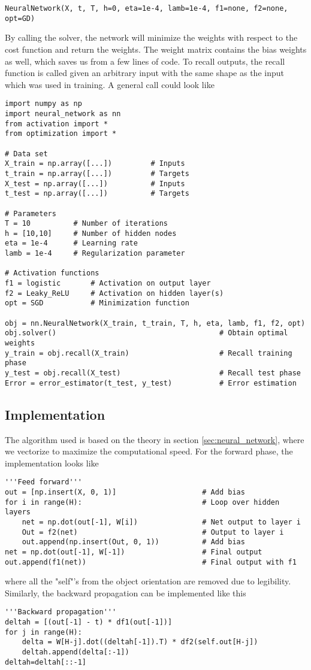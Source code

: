 \lstset{basicstyle=\scriptsize}
\begin{lstlisting}
NeuralNetwork(X, t, T, h=0, eta=1e-4, lamb=1e-4, f1=none, f2=none, opt=GD)
\end{lstlisting}
By calling the solver, the network will minimize the weights with respect to the cost function and return the weights. The weight matrix contains the bias weights as well, which saves us from a few lines of code. To recall outputs, the recall function is called given an arbitrary input with the same shape as the input which was used in training. A general call could look like

\lstset{basicstyle=\scriptsize}
\begin{lstlisting}
import numpy as np
import neural_network as nn
from activation import *
from optimization import *

# Data set
X_train = np.array([...])         # Inputs
t_train = np.array([...])         # Targets
X_test = np.array([...])          # Inputs
t_test = np.array([...])          # Targets

# Parameters
T = 10          # Number of iterations
h = [10,10]     # Number of hidden nodes
eta = 1e-4      # Learning rate
lamb = 1e-4     # Regularization parameter

# Activation functions
f1 = logistic       # Activation on output layer
f2 = Leaky_ReLU	    # Activation on hidden layer(s)
opt = SGD           # Minimization function

obj = nn.NeuralNetwork(X_train, t_train, T, h, eta, lamb, f1, f2, opt)
obj.solver()                                      # Obtain optimal weights
y_train = obj.recall(X_train)                     # Recall training phase
y_test = obj.recall(X_test)                       # Recall test phase
Error = error_estimator(t_test, y_test)           # Error estimation
\end{lstlisting}

\subsection{Implementation}
The algorithm used is based on the theory in section \ref{sec:neural_network}, where we vectorize to maximize the computational speed. For the forward phase, the implementation looks like
\lstset{basicstyle=\scriptsize}
\begin{lstlisting}
'''Feed forward'''
out = [np.insert(X, 0, 1)]  	              # Add bias
for i in range(H):     		                  # Loop over hidden layers
	net = np.dot(out[-1], W[i])     		  # Net output to layer i
	Out = f2(net)                        	  # Output to layer i
	out.append(np.insert(Out, 0, 1))     	  # Add bias
net = np.dot(out[-1], W[-1])        		  # Final output
out.append(f1(net))                 		  # Final output with f1
\end{lstlisting}
where all the "self"'s from the object orientation are removed due to legibility. Similarly, the backward propagation can be implemented like this
\begin{lstlisting}
'''Backward propagation'''
deltah = [(out[-1] - t) * df1(out[-1])]
for j in range(H):
	delta = W[H-j].dot((deltah[-1]).T) * df2(self.out[H-j])
	deltah.append(delta[:-1])
deltah=deltah[::-1]
\end{lstlisting}